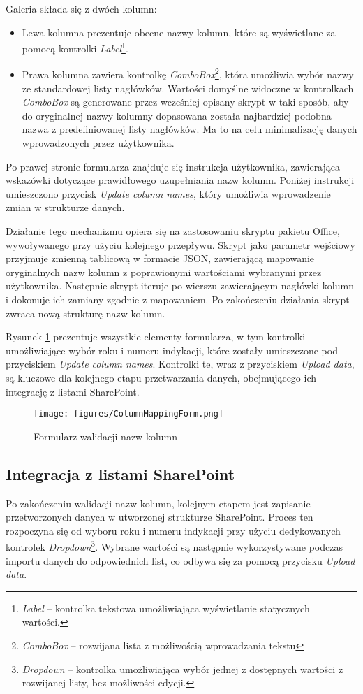\noindent Galeria składa się z dwóch kolumn: 
\begin{itemize} 
    \item Lewa kolumna prezentuje obecne nazwy kolumn, które są wyświetlane za pomocą kontrolki \emph{Label}\footnote{\emph{Label} -- kontrolka tekstowa umożliwiająca wyświetlanie statycznych wartości.}. 
    \item Prawa kolumna zawiera kontrolkę \emph{ComboBox}\footnote{\emph{ComboBox} -- rozwijana lista z możliwością wprowadzania tekstu}, która umożliwia wybór nazwy ze standardowej listy nagłówków. Wartości domyślne widoczne w kontrolkach \emph{ComboBox} są generowane przez wcześniej opisany skrypt w taki sposób, aby do oryginalnej nazwy kolumny dopasowana została najbardziej podobna nazwa z predefiniowanej listy nagłówków. Ma to na celu minimalizację danych wprowadzonych przez użytkownika.
\end{itemize}

Po prawej stronie formularza znajduje się instrukcja użytkownika, zawierająca wskazówki dotyczące prawidłowego uzupełniania nazw kolumn. Poniżej instrukcji umieszczono przycisk \emph{Update column names}, który umożliwia wprowadzenie zmian w strukturze danych.

\noindent Działanie tego mechanizmu opiera się na zastosowaniu skryptu pakietu Office, wywoływanego przy użyciu kolejnego przepływu. Skrypt jako parametr wejściowy przyjmuje zmienną tablicową w formacie JSON, zawierającą mapowanie oryginalnych nazw kolumn z poprawionymi wartościami wybranymi przez użytkownika. Następnie skrypt iteruje po wierszu zawierającym nagłówki kolumn i dokonuje ich zamiany zgodnie z mapowaniem. Po zakończeniu działania skrypt zwraca nową strukturę nazw kolumn.

Rysunek \ref{fig:columnmappingform} prezentuje wszystkie elementy formularza, w tym kontrolki umożliwiające wybór roku i numeru indykacji, które zostały umieszczone pod przyciskiem \emph{Update column names}. Kontrolki te, wraz z przyciskiem \emph{Upload data}, są kluczowe dla kolejnego etapu przetwarzania danych, obejmującego ich integrację z listami SharePoint. 


\begin{figure}[t]
    \centering
    \texttt{[image: figures/ColumnMappingForm.png]}
    \caption{Formularz walidacji nazw kolumn}
    \label{fig:columnmappingform}
\end{figure}

\subsection{Integracja z listami SharePoint} Po zakończeniu walidacji nazw kolumn, kolejnym etapem jest zapisanie przetworzonych danych w utworzonej strukturze SharePoint. Proces ten rozpoczyna się od wyboru roku i numeru indykacji przy użyciu dedykowanych kontrolek \emph{Dropdown}\footnote{\emph{Dropdown} -- kontrolka umożliwiająca wybór jednej z dostępnych wartości z rozwijanej listy, bez możliwości edycji.}. Wybrane wartości są następnie wykorzystywane podczas importu danych do odpowiednich list, co odbywa się za pomocą przycisku \emph{Upload data}. 

